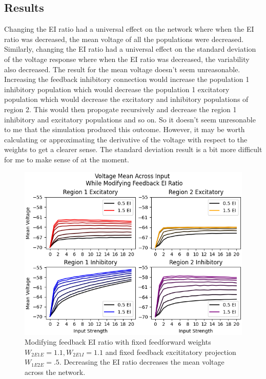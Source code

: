\documentclass[10pt]{article}
\begin{document}
\subsection{Results}
Changing the EI ratio had a universal effect on the network where when the EI ratio was decreased, the mean voltage of all the populations were decreased. Similarly, changing the EI ratio had a universal effect on the standard deviation of the voltage response where when the EI ratio was decreased, the variability also decreased. The result for the mean voltage doesn't seem unreasonable. Increasing the feedback inhibitory connection would increase the population 1 inhibitory population which would decrease the population 1 excitatory population which would decrease the excitatory and inhibitory populations of region 2. This would then propogate recursively and decrease the region 1 inhibitory and excitatory populations and so on. So it doesn't seem unresonable to me that the simulation produced this outcome. However, it may be worth calculating or approximating the derivative of the voltage with respect to the weights to get a clearer sense. The standard deviation result is a bit more difficult for me to make sense of at the moment.
\begin{figure}
    \centering
    \includegraphics[scale=.8]{twoRegion/EIRatioVoltageMean.png}
    \caption{Modifying feedback EI ratio with fixed feedforward weights $W_{2E1E} = 1.1, W_{2E1I}=1.1$ and fixed feedback excititatory projection $W_{1E2E} = .5$. Decreasing the EI ratio decreases the mean voltage across the network.}
\end{figure}
\end{document}
